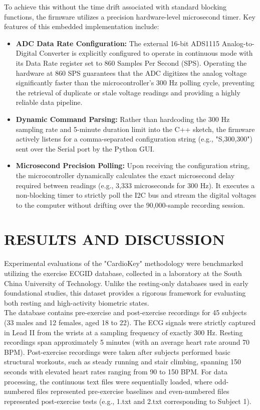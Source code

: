 \documentclass[12pt,a4paper]{report}
\begin{document}
To achieve this without the time drift associated with standard blocking functions, the firmware utilizes a precision hardware-level microsecond timer. Key features of this embedded implementation include:

\begin{itemize}
    \item \textbf{ADC Data Rate Configuration:} The external 16-bit ADS1115 Analog-to-Digital Converter is explicitly configured to operate in continuous mode with its Data Rate register set to 860 Samples Per Second (SPS). Operating the hardware at 860 SPS guarantees that the ADC digitizes the analog voltage significantly faster than the microcontroller's 300 Hz polling cycle, preventing the retrieval of duplicate or stale voltage readings and providing a highly reliable data pipeline.
    \item \textbf{Dynamic Command Parsing:} Rather than hardcoding the 300 Hz sampling rate and 5-minute duration limit into the C++ sketch, the firmware actively listens for a comma-separated configuration string (e.g., "S,300,300") sent over the Serial port by the Python GUI. 
    \item \textbf{Microsecond Precision Polling:} Upon receiving the configuration string, the microcontroller dynamically calculates the exact microsecond delay required between readings (e.g., 3,333 microseconds for 300 Hz). It executes a non-blocking timer to strictly poll the I2C bus and stream the digital voltages to the computer without drifting over the 90,000-sample recording session.
\end{itemize}

\chapter{RESULTS AND DISCUSSION}
Experimental evaluations of the "CardioKey" methodology were benchmarked utilizing the exercise ECGID database, collected in a laboratory at the South China University of Technology. Unlike the resting-only databases used in early foundational studies, this dataset provides a rigorous framework for evaluating both resting and high-activity biometric states. \\

The database contains pre-exercise and post-exercise recordings for 45 subjects (33 males and 12 females, aged 18 to 22). The ECG signals were strictly captured in Lead II from the wrists at a sampling frequency of exactly 300 Hz. Resting recordings span approximately 5 minutes (with an average heart rate around 70 BPM). Post-exercise recordings were taken after subjects performed basic structural workouts, such as steady running and stair climbing, spanning 150 seconds with elevated heart rates ranging from 90 to 150 BPM. For data processing, the continuous text files were sequentially loaded, where odd-numbered files represented pre-exercise baselines and even-numbered files represented post-exercise tests (e.g., 1.txt and 2.txt corresponding to Subject 1).
\end{document}
